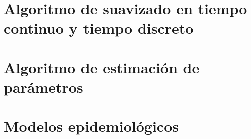 \documentclass[
	spanish, %
	letterpaper, oneside
]{book}
\begin{document}
\chapter{Algoritmo de suavizado en tiempo continuo y tiempo discreto}


\chapter{Algoritmo de estimación de parámetros}


\chapter{Modelos epidemiológicos}





\end{document}
